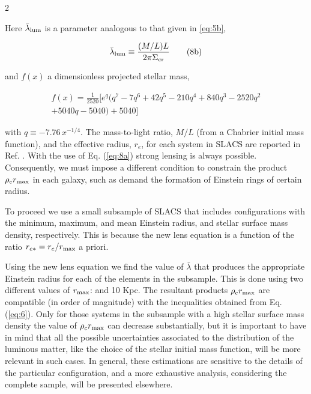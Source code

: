 \documentclass {article}
\begin{document}
\begin{multicols} {2}


Here $\bar{\lambda}_{\textup{lum}}$ is a parameter analogous to that given in \ref{eq:5b},

\begin{equation} \label{eq:8b}
\bar{\lambda}_{\textup{lum}} \equiv \frac {(M / L)L} {2 \pi \Sigma_{\textup{cr}}} \tag{8b}
\end {equation}

and $f(x)$ a dimensionless projected stellar mass,

\begin{multline} \label{eq:8c}
f(x) = \frac {1} {2520} [ e^q ( q^7 -7q^6 + 42q^5 - 210q^4 + 840q^3 - 2520q^2\\ + 5040q -5040 ) + 5040 ] \tag{8c}
\end{multline}

with $ q \equiv -7.76 \, x^{-1/4} $. The mass-to-light ratio, $M/L$ (from a Chabrier initial mass function), and the effective radius, $r_e$, for each system in SLACS are reported
in Ref. \cite{Auger_2009}. With the use of Eq. (\ref{eq:8a}) strong lensing is always possible. Consequently, we must impose a different condition to constrain the product $\rho_c r_{\textup{max}}$ in each galaxy, such as demand the formation of Einstein rings of certain radius.


To proceed we use a small subsample of SLACS that includes configurations with the minimum, maximum, and mean Einstein radius, and stellar surface mass density, respectively. This is because the new lens equation is a function of the ratio $r_{e*} = r_e / r_{\textup{max}}$ a priori.


Using the new lens equation we find the value of $\bar{\lambda}$ that produces the appropriate Einstein radius for each of the elements in the subsample. This is done using two different values of $r_{\textup{max}}$: and 10 Kpc. The resultant products $\rho_c r_{\textup{max}}$ are compatible (in order of magnitude) with the inequalities obtained from Eq. (\ref{eq:6}). Only for those systems in the subsample with a high stellar surface mass density the value of $\rho_c r_{\textup{max}}$ can decrease substantially, but it is important to have in mind that all the possible uncertainties associated to the distribution of the luminous matter, like the choice of the stellar initial mass function, will be more relevant in such cases. In general, these estimations are sensitive to the details of the
particular configuration, and a more exhaustive analysis, considering the complete sample, will be presented elsewhere.



\end{multicols}
\end{document}
